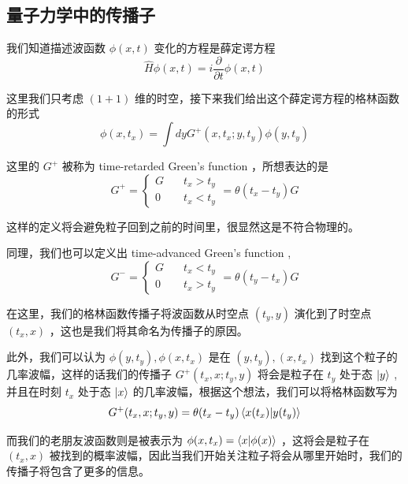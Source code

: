 \documentclass{article}
\begin{document}
\subsection{量子力学中的传播子}
我们知道描述波函数 $\phi(x,t)$ 变化的方程是薛定谔方程 
\begin{equation*}
    \hat{H}\phi(x,t) = i\frac{\partial}{\partial t}\phi(x,t)
\end{equation*}

这里我们只考虑 $(1 + 1)$ 维的时空，接下来我们给出这个薛定谔方程的格林函数的形式
\begin{equation*}
    \phi(x,t_x) = \int dy G^{+}(x,t_x;y,t_y)\phi(y,t_y)
\end{equation*}

这里的 $G^{+}$ 被称为 time-retarded Green's function ，所想表达的是
\begin{equation*}
    G^+ = 
    \begin{cases}
        G &\quad t_x > t_y \\
        0 &\quad t_x < t_y
    \end{cases} 
    = \theta(t_x - t_y)G
\end{equation*}

这样的定义将会避免粒子回到之前的时间里，很显然这是不符合物理的。

同理，我们也可以定义出 time-advanced Green's function ,
\begin{equation*}
    G^- =
    \begin{cases}
        G &\quad t_x < t_y \\
        0 &\quad t_x > t_y
    \end{cases}
    = \theta(t_y - t_x)G
\end{equation*}

在这里，我们的格林函数传播子将波函数从时空点 $(t_y,y)$ 演化到了时空点 $(t_x,x)$ ，这也是我们将其命名为传播子的原因。

此外，我们可以认为 $\phi(y,t_y),\phi(x,t_x)$ 是在 $(y,t_y),(x,t_x)$ 找到这个粒子的几率波幅，这样的话我们的传播子 $G^+(t_x,x;t_y,y)$ 将会是粒子在 $t_y$ 处于态 $\ket{y}$ ,并且在时刻 $t_x$ 处于态 $\ket{x}$ 的几率波幅，根据这个想法，我们可以将格林函数写为
\begin{equation*}
    G^+(t_x,x;t_y,y) = \theta(t_x - t_y) \bra{x(t_x)}\ket{y(t_y)}
\end{equation*}

而我们的老朋友波函数则是被表示为 $\phi(x,t_x) = \braket{x}{\phi(x)}$ ，这将会是粒子在 $(t_x,x)$ 被找到的概率波幅，因此当我们开始关注粒子将会从哪里开始时，我们的传播子将包含了更多的信息。
\end{document}
